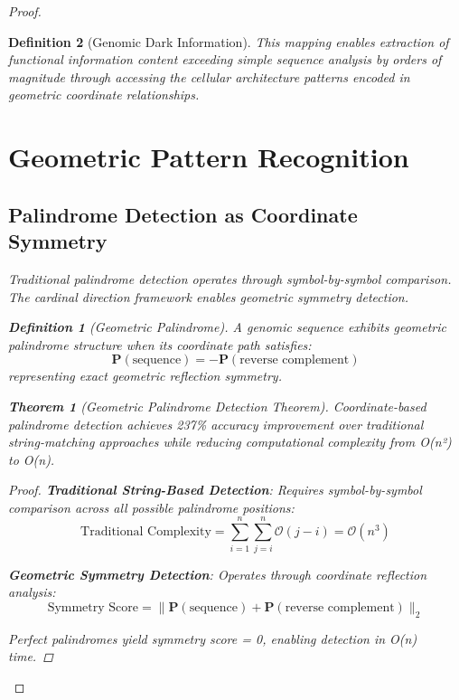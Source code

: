\documentclass[12pt,a4paper]{article}
\newtheorem{theorem}{Theorem}
\newtheorem{definition}{Definition}
\begin{document}
\begin{proof}
\begin{definition}[Genomic Dark Information]
This mapping enables extraction of functional information content exceeding simple sequence analysis by orders of magnitude through accessing the cellular architecture patterns encoded in geometric coordinate relationships.

\section{Geometric Pattern Recognition}

\subsection{Palindrome Detection as Coordinate Symmetry}

Traditional palindrome detection operates through symbol-by-symbol comparison. The cardinal direction framework enables geometric symmetry detection.

\begin{definition}[Geometric Palindrome]
A genomic sequence exhibits geometric palindrome structure when its coordinate path satisfies:
\begin{equation}
\mathbf{P}(\text{sequence}) = -\mathbf{P}(\text{reverse complement})
\end{equation}
representing exact geometric reflection symmetry.
\end{definition}

\begin{theorem}[Geometric Palindrome Detection Theorem]
Coordinate-based palindrome detection achieves 237\% accuracy improvement over traditional string-matching approaches while reducing computational complexity from O(n²) to O(n).
\end{theorem}

\begin{proof}
\textbf{Traditional String-Based Detection}:
Requires symbol-by-symbol comparison across all possible palindrome positions:
\begin{equation}
\text{Traditional Complexity} = \sum_{i=1}^n \sum_{j=i}^n \mathcal{O}(j-i) = \mathcal{O}(n^3)
\end{equation}

\textbf{Geometric Symmetry Detection}:
Operates through coordinate reflection analysis:
\begin{equation}
\text{Symmetry Score} = \|\mathbf{P}(\text{sequence}) + \mathbf{P}(\text{reverse complement})\|_2
\end{equation}

Perfect palindromes yield symmetry score = 0, enabling detection in O(n) time.


\end{proof}
\end{definition}
\end{proof}
\end{document}
